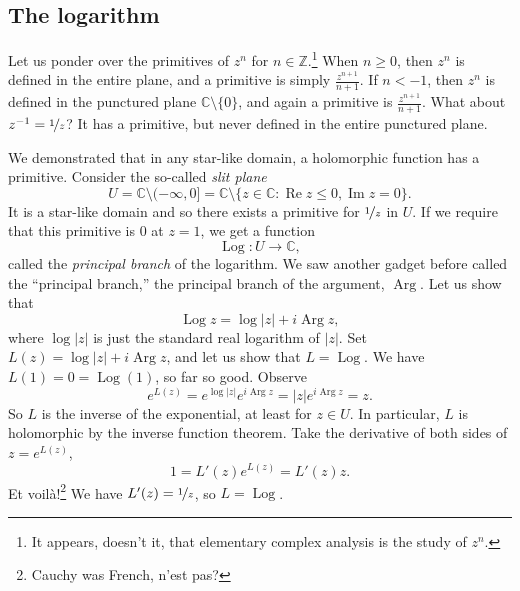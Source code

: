 \documentclass[12pt,openany]{book}
\renewcommand{\Re}{\operatorname{Re}}
\renewcommand{\Im}{\operatorname{Im}}
\newcommand{\Arg}{\operatorname{Arg}}
\newcommand{\Log}{\operatorname{Log}}
\newcommand{\sabs}[1]{\lvert {#1} \rvert}
\newcommand{\C}{{\mathbb{C}}}
\newcommand{\Z}{{\mathbb{Z}}}
\newcommand{\myindex}[1]{#1\index{#1}}
\newcommand{\myquote}[1]{``#1''}
\theoremstyle{plain}
\theoremstyle{remark}
\theoremstyle{definition}
\theoremstyle{exercise}
\theoremstyle{example}
\begin{document}
\subsection{The logarithm}

Let us ponder over the primitives of $z^n$ for $n \in \Z$.\footnote{It appears,
doesn't it, that elementary complex analysis is the study of $z^n$.}
When $n \geq 0$, 
then $z^n$ is defined in the entire plane, and a primitive is
simply $\frac{z^{n+1}}{n+1}$.  If $n < -1$, then $z^n$ is defined
in the punctured plane $\C \setminus \{0\}$, and again
a primitive is $\frac{z^{n+1}}{n+1}$.  What about $z^{-1} =
\nicefrac{1}{z}$?  It has a primitive, but never defined in
the entire punctured plane.

We demonstrated that in any star-like domain, a holomorphic function has a
primitive.  Consider the so-called \emph{\myindex{slit plane}}
\begin{equation*}
U = \C \setminus (-\infty,0] = \C \setminus \bigl\{ z \in \C : \Re z \leq 0 , \Im z = 0 \bigr\}.
\end{equation*}
It is a star-like domain and
so there exists a
primitive for $\nicefrac{1}{z}$ in $U$.
If we
require that this primitive is $0$ at $z=1$,
we get a function
%
\begin{equation*}
\Log \colon U \to \C ,
\end{equation*}
called the \emph{\myindex{principal branch}} of the logarithm.
We saw another gadget before called the \myquote{principal branch,} 
the principal branch of the argument, $\Arg$.  Let us show that
\begin{equation*}
\Log z = \log \sabs{z} + i \Arg z ,
\end{equation*}
where $\log \sabs{z}$ is just the standard real logarithm of $\sabs{z}$.
Set $L(z) = \log \sabs{z} + i \Arg z$, and let us show that $L = \Log$.
We have $L(1) = 0 = \Log(1)$, so far so good.
Observe
\begin{equation*}
e^{L(z)}
=
e^{\log \sabs{z}} e^{i \Arg z}
=
\sabs{z} e^{i \Arg z} = z .
\end{equation*}
So $L$ is the inverse of the exponential, at least for $z \in U$.
In particular, $L$ is holomorphic by the inverse function
theorem.
Take the derivative of both sides of $z = e^{L(z)}$,
\begin{equation*}
1 = L'(z) e^{L(z)} = L'(z) z .
\end{equation*}
Et voil\`a!\footnote{Cauchy was French, n'est pas?}
We have $L'(z) = \nicefrac{1}{z}$, so $L = \Log$.
\end{document}

